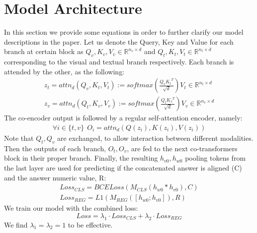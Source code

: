 \documentclass[runningheads]{llncs}
\begin{document}
\section{Model Architecture}
In this section we provide some equations in order to further clarify our model descriptions in the paper. Let us denote the Query, Key and Value for each branch at certain block as $Q_v, K_v, V_v \in \mathbb{R}^{n_v\times d}$ and $Q_t, K_t, V_t \in \mathbb{R}^{n_t\times d}$ corresponding to the visual and textual branch respectively. Each branch is attended by the other, as the following:
\begin{eqnarray}
    z_t = attn_d(Q_v, K_t, V_t) := \mathit{softmax}(\frac{Q_v {K_t}^T}{\sqrt{d}}) V_t \in \mathbb{R}^{n_t\times d} \\
    z_v = attn_d(Q_t, K_v, V_v) := \mathit{softmax}(\frac{Q_t {K_v}^T}{\sqrt{d}}) V_v \in \mathbb{R}^{n_v\times d}
\end{eqnarray}
    The co-encoder output is followed by a regular self-attention encoder, namely:
\begin{eqnarray}
    \forall i\in \{t, v\}~~O_{i} = attn_d(Q(z_i), K(z_i), V(z_i))
\end{eqnarray}
Note that $Q_t, Q_v$ are exchanged, to allow interaction between different modalities. Then the outputs of each branch, $O_{t}, O_{v}$, are fed to the next co-transformers block in their proper branch. Finally, the resulting $h_{v0} , h_{w0}$ pooling tokens from the last layer are used for predicting if the concatenated answer is aligned (C) and the answer numeric value, R: 
\begin{eqnarray}
Loss_{CLS} = BCELoss(M_{CLS}(h_{w0} * h_{v0}), C)\\
Loss_{REG} = L1(M_{REG}([h_{w0};h_{v0}]), R)
\end{eqnarray}
We train our model with the combined loss:
\begin{equation}
    Loss = \lambda_1 \cdot Loss_{CLS} + \lambda_2 \cdot Loss_{REG}
\end{equation}
We find $\lambda_1 = \lambda_2 = 1$ to be effective.
\end{document}
